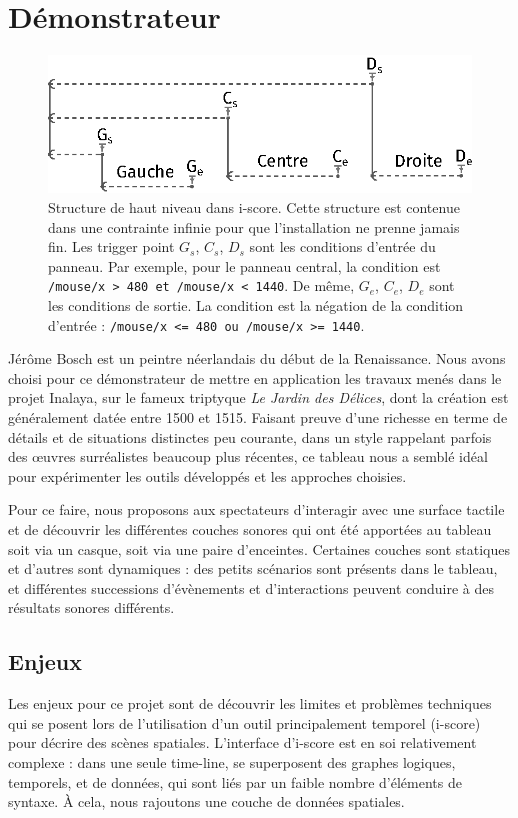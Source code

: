 \documentclass{article}
\begin{document}
    \section*{Démonstrateur}
    \begin{figure}[h]
        \centering
        \includegraphics{images/1stcase.eps}
        \caption{Structure de haut niveau dans i-score. Cette structure est contenue dans une contrainte infinie pour que l'installation ne prenne jamais fin. Les trigger point $G_s$, $C_s$, $D_s$ sont les conditions d'entrée du panneau. Par exemple, pour le panneau central, la condition est \lstinline{/mouse/x > 480 et /mouse/x < 1440}. De même, $G_e$, $C_e$, $D_e$ sont les conditions de sortie. La condition est la négation de la condition d'entrée : \lstinline{/mouse/x <= 480 ou /mouse/x >= 1440}.}
        \label{fig.1stlevel}
    \end{figure}
    Jérôme Bosch est un peintre néerlandais du début de la Renaissance.
    Nous avons choisi pour ce démonstrateur de mettre en application les travaux menés dans le projet Inalaya, sur le fameux triptyque \emph{Le Jardin des Délices}, dont la création est généralement datée entre 1500 et 1515. 
    Faisant preuve d'une richesse en terme de détails et de situations distinctes peu courante, dans un style rappelant parfois des œuvres surréalistes beaucoup plus récentes, ce tableau nous a semblé idéal pour expérimenter les outils développés et les approches choisies.
    
    Pour ce faire, nous proposons aux spectateurs d'interagir avec une surface tactile et de découvrir les différentes couches sonores qui ont été apportées au tableau soit via un casque, soit via une paire d'enceintes.
    Certaines couches sont statiques et d'autres sont dynamiques : des petits scénarios sont présents dans le tableau, et différentes successions d'évènements et d'interactions peuvent conduire à des résultats sonores différents.
    
    \subsection*{Enjeux}
    Les enjeux pour ce projet sont de découvrir les limites et problèmes techniques qui se posent lors de l'utilisation d'un outil principalement temporel (i-score) pour décrire des scènes spatiales.
    L'interface d'i-score est en soi relativement complexe : dans une seule time-line, se superposent des graphes logiques, temporels, et de données, qui sont liés par un faible nombre d'éléments de syntaxe.
    À cela, nous rajoutons une couche de données spatiales.
    
\end{document}

